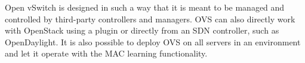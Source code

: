 %	

Open vSwitch is designed in such a way that it is meant to be managed and controlled by third-party controllers and managers. OVS can also directly work with OpenStack using a plugin or directly from an SDN controller, such as OpenDaylight. It is also possible to deploy OVS on all servers in an environment and let it operate with the MAC learning functionality. 